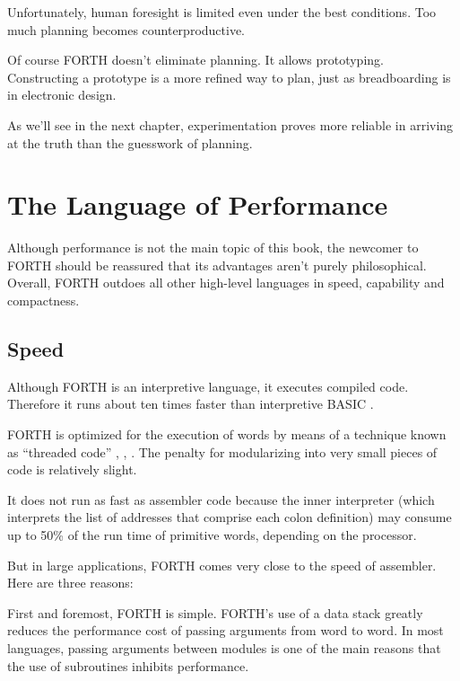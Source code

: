Unfortunately, human foresight is limited even under the best
conditions.  Too much planning becomes counterproductive.

Of course FORTH doesn't eliminate planning. It allows prototyping.
Constructing a prototype is a more refined way to plan, just as
breadboarding is in electronic design.

As we'll see in the next chapter, experimentation proves more reliable
in arriving at the truth than the guesswork of planning.


\section{The Language of Performance}
Although performance is not the main topic of this book, the newcomer
to FORTH should be reassured that its advantages aren't purely
philosophical.  Overall, FORTH outdoes all other high-level languages
in speed, capability and compactness.


\subsection{Speed}
Although FORTH is an interpretive language, it executes compiled code.
Therefore it runs about ten times faster than interpretive BASIC
.

FORTH is optimized for the execution of words by means of a technique
known as ``threaded code'' \cite{bell72}, \cite{dewar},
\cite{kogge82}. The penalty for modularizing into very small pieces of
code is relatively slight.

It does not run as fast as assembler code because the inner
interpreter (which interprets the list of addresses that comprise each
colon definition) may consume up to 50\% of the run time of primitive
words, depending on the processor.

But in large applications, FORTH comes very close to the speed of
assembler. Here are three reasons:

First and foremost, FORTH is simple. FORTH's use of a data stack
greatly reduces the performance cost of passing arguments from word to
word. In most languages, passing arguments between modules is one of
the main reasons that the use of subroutines inhibits performance.

